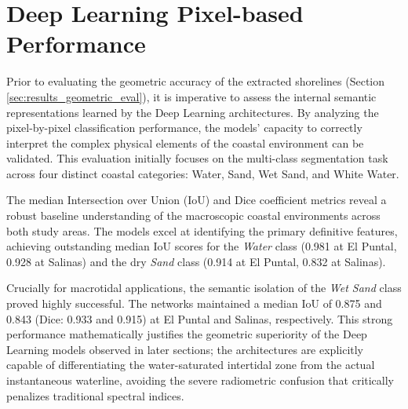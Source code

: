 ﻿\documentclass[ENG]{TFUOC}%
\begin{document}

\section{Deep Learning Pixel-based Performance}
\label{sec:results_pixel_eval}
Prior to evaluating the geometric accuracy of the extracted shorelines (Section \ref{sec:results_geometric_eval}), it is imperative to assess the internal semantic representations learned by the Deep Learning architectures. By analyzing the pixel-by-pixel classification performance, the models' capacity to correctly interpret the complex physical elements of the coastal environment can be validated. This evaluation initially focuses on the multi-class segmentation task across four distinct coastal categories: Water, Sand, Wet Sand, and White Water.

The median Intersection over Union (IoU) and Dice coefficient metrics reveal a robust baseline understanding of the macroscopic coastal environments across both study areas. The models excel at identifying the primary definitive features, achieving outstanding median IoU scores for the \textit{Water} class (0.981 at El Puntal, 0.928 at Salinas) and the dry \textit{Sand} class (0.914 at El Puntal, 0.832 at Salinas). 

Crucially for macrotidal applications, the semantic isolation of the \textit{Wet Sand} class proved highly successful. The networks maintained a median IoU of 0.875 and 0.843 (Dice: 0.933 and 0.915) at El Puntal and Salinas, respectively. This strong performance mathematically justifies the geometric superiority of the Deep Learning models observed in later sections; the architectures are explicitly capable of differentiating the water-saturated intertidal zone from the actual instantaneous waterline, avoiding the severe radiometric confusion that critically penalizes traditional spectral indices.
\end{document}
